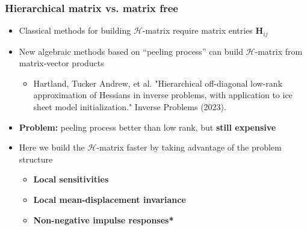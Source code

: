 \documentclass[10pt,final,xcolor=dvipsnames]{beamer}
\begin{document}
\begin{frame}
	\frametitle{Hierarchical matrix vs. matrix free}
	\begin{itemize}
		\setlength\itemsep{1.5em}
		\item Classical methods for building $\mathcal{H}$-matrix require matrix entries $\mathbf{H}_{ij}$ 
		\item New algebraic methods based on ``peeling process'' can build $\mathcal{H}$-matrix from matrix-vector products
		\begin{itemize}
			\item {\scriptsize Hartland, Tucker Andrew, et al. "Hierarchical oﬀ-diagonal low-rank approximation of Hessians in inverse problems, with application to ice sheet model initialization." Inverse Problems (2023).}
		\end{itemize} 
		\item \textbf{Problem:} peeling process better than low rank, but \textbf{still expensive}
		\item Here we build the $\mathcal{H}$-matrix faster by taking advantage of the problem structure
		\begin{itemize}
			\item \textbf{Local sensitivities}
			\item \textbf{Local mean-displacement invariance}
			\item \textbf{Non-negative impulse responses*}
		\end{itemize}
	\end{itemize}
\end{frame}
\end{document}
